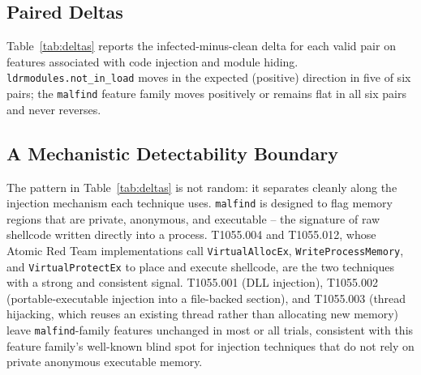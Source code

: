 \documentclass[conference]{IEEEtran}
\begin{document}
\subsection{Paired Deltas}
Table~\ref{tab:deltas} reports the infected-minus-clean delta for each valid
pair on features associated with code injection and module hiding.
\texttt{ldrmodules.not\_in\_load} moves in the expected (positive) direction in
five of six pairs; the \texttt{malfind} feature family moves positively or
remains flat in all six pairs and never reverses.

\begin{table}[htbp]
\caption{Infected$-$Clean Deltas, Valid Pairs ($n=6$)}
\label{tab:deltas}
\centering
{}
\end{table}

\subsection{A Mechanistic Detectability Boundary}
The pattern in Table~\ref{tab:deltas} is not random: it separates cleanly
along the injection mechanism each technique uses. \texttt{malfind} is
designed to flag memory regions that are private, anonymous, and executable --
the signature of raw shellcode written directly into a process. T1055.004 and
T1055.012, whose Atomic Red Team implementations call
\texttt{VirtualAllocEx}, \texttt{WriteProcessMemory}, and
\texttt{VirtualProtectEx} to place and execute shellcode, are the two
techniques with a strong and consistent signal. T1055.001 (DLL injection),
T1055.002 (portable-executable injection into a file-backed section), and
T1055.003 (thread hijacking, which reuses an existing thread rather than
allocating new memory) leave \texttt{malfind}-family features unchanged in
most or all trials, consistent with this feature family's well-known blind
spot for injection techniques that do not rely on private anonymous
executable memory.
\end{document}
